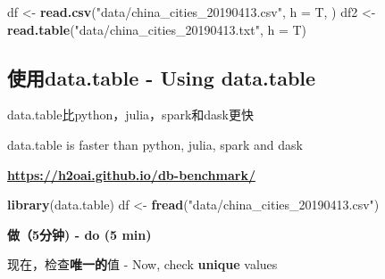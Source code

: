 \documentclass[]{book}
\newenvironment{Shaded}{\begin{snugshade}}{\end{snugshade}}
\newcommand{\DataTypeTok}[1]{\textcolor[rgb]{0.13,0.29,0.53}{#1}}
\newcommand{\DecValTok}[1]{\textcolor[rgb]{0.00,0.00,0.81}{#1}}
\newcommand{\KeywordTok}[1]{\textcolor[rgb]{0.13,0.29,0.53}{\textbf{#1}}}
\newcommand{\NormalTok}[1]{#1}
\newcommand{\OperatorTok}[1]{\textcolor[rgb]{0.81,0.36,0.00}{\textbf{#1}}}
\newcommand{\StringTok}[1]{\textcolor[rgb]{0.31,0.60,0.02}{#1}}
\begin{document}
\begin{Shaded}
\begin{Highlighting}[]
\NormalTok{df <-}\StringTok{ }\KeywordTok{read.csv}\NormalTok{(}\StringTok{"data/china_cities_20190413.csv"}\NormalTok{, }\DataTypeTok{h =}\NormalTok{ T, )}
\NormalTok{df2 <-}\StringTok{ }\KeywordTok{read.table}\NormalTok{(}\StringTok{"data/china_cities_20190413.txt"}\NormalTok{, }\DataTypeTok{h =}\NormalTok{ T)}
\end{Highlighting}
\end{Shaded}

\hypertarget{data.table---using-data.table}{%
\subsection{使用data.table - Using data.table}\label{data.table---using-data.table}}

data.table比python，julia，spark和dask更快

data.table is faster than python, julia, spark and dask

\textbf{\url{https://h2oai.github.io/db-benchmark/}}

\begin{Shaded}
\begin{Highlighting}[]
\KeywordTok{library}\NormalTok{(data.table)}
\NormalTok{df <-}\StringTok{ }\KeywordTok{fread}\NormalTok{(}\StringTok{"data/china_cities_20190413.csv"}\NormalTok{)}
\end{Highlighting}
\end{Shaded}

\textbf{做（5分钟) - do (5 min)}

\begin{Shaded}
\end{Shaded}

现在，检查\textbf{唯一的}值 - Now, check \textbf{unique} values

\begin{Shaded}
\end{Shaded}
\end{document}
